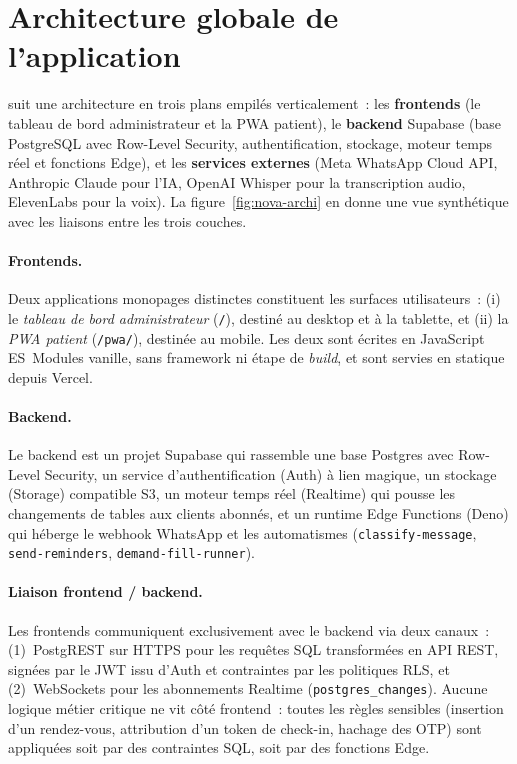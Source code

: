 \section{Architecture globale de l'application}
\nova{} suit une architecture en trois plans empilés
verticalement~: les \textbf{frontends} (le tableau de bord
administrateur et la PWA patient), le \textbf{backend} Supabase
(base PostgreSQL avec Row-Level Security, authentification,
stockage, moteur temps réel et fonctions Edge), et les
\textbf{services externes} (Meta WhatsApp Cloud API, Anthropic
Claude pour l'IA, OpenAI Whisper pour la transcription audio,
ElevenLabs pour la voix). La figure~\ref{fig:nova-archi} en donne
une vue synthétique avec les liaisons entre les trois couches.

\paragraph{Frontends.}
Deux applications monopages distinctes constituent les surfaces
utilisateurs~: (i) le \emph{tableau de bord administrateur}
(\texttt{/}), destiné au desktop et à la tablette, et (ii) la
\emph{PWA patient} (\texttt{/pwa/}), destinée au mobile. Les deux
sont écrites en JavaScript ES~Modules vanille, sans framework ni
étape de \emph{build}, et sont servies en statique depuis Vercel.

\paragraph{Backend.}
Le backend est un projet Supabase qui rassemble une base Postgres
avec Row-Level Security, un service d'authentification (Auth) à
lien magique, un stockage (Storage) compatible S3, un moteur
temps réel (Realtime) qui pousse les changements de tables aux
clients abonnés, et un runtime Edge Functions (Deno) qui héberge le
webhook WhatsApp et les automatismes (\texttt{classify-message},
\texttt{send-reminders}, \texttt{demand-fill-runner}).

\paragraph{Liaison frontend / backend.}
Les frontends communiquent exclusivement avec le backend via deux
canaux~: (1)~PostgREST sur HTTPS pour les requêtes SQL transformées
en API REST, signées par le JWT issu d'Auth et contraintes par les
politiques RLS, et (2)~WebSockets pour les abonnements Realtime
(\texttt{postgres\_changes}). Aucune logique métier critique ne vit
côté frontend~: toutes les règles sensibles (insertion d'un
rendez-vous, attribution d'un token de check-in, hachage des OTP)
sont appliquées soit par des contraintes SQL, soit par des fonctions
Edge.

